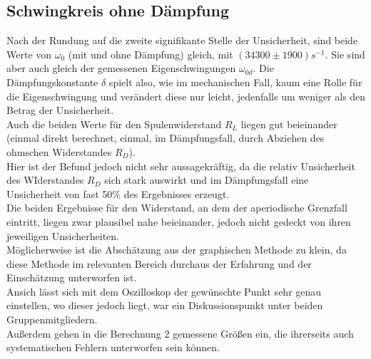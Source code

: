 \documentclass[12pt,a4paper]{article}
\begin{document}
\begin{multicols}{2}
%
%


\subsection{Schwingkreis ohne Dämpfung}

Nach der Rundung auf die zweite signifikante Stelle der Unsicherheit, sind beide Werte von $\omega_0$ (mit und ohne Dämpfung) gleich, mit $(34300 \pm 1900)s^{-1}$. Sie sind aber auch gleich der gemessenen Eigenschwingungen $\omega_{0d}$. Die Dämpfungskonstante $\delta$ spielt also, wie im mechanischen Fall, kaum eine Rolle für die Eigenschwingung und verändert diese nur leicht, jedenfalls um weniger als den Betrag der Unsicherheit.\\

\noindent Auch die beiden Werte für den Spulenwiderstand $R_L$ liegen gut beieinander (einmal direkt berechnet, einmal, im Dämpfungsfall, durch Abziehen des ohmschen Widerstandes $R_D$). \\
Hier ist der Befund jedoch nicht sehr aussagekräftig, da die relativ Unsicherheit des WIderstandes $R_D$ sich stark auswirkt und im Dämpfungsfall eine Unsicherheit von fast 50\% des Ergebnisses erzeugt.\\

\noindent Die beiden Ergebnisse für den Widerstand, an dem der aperiodische Grenzfall eintritt, liegen zwar plausibel nahe beieinander, jedoch nicht gedeckt von ihren jeweiligen Unsicherheiten.\\
Möglicherweise ist die Abschätzung aus der graphischen Methode zu klein, da diese Methode im relevanten Bereich durchaus der Erfahrung und der Einschätzung unterworfen ist.\\
Ansich lässt sich mit dem Oszilloskop der gewünschte Punkt sehr genau einstellen, wo dieser jedoch liegt, war ein Diskussionspunkt unter beiden Gruppenmitgliedern.\\
Außerdem gehen in die Berechnung 2 gemessene Größen ein, die ihrerseits auch systematischen Fehlern unterworfen sein können.\\


\end{multicols}
\end{document}
